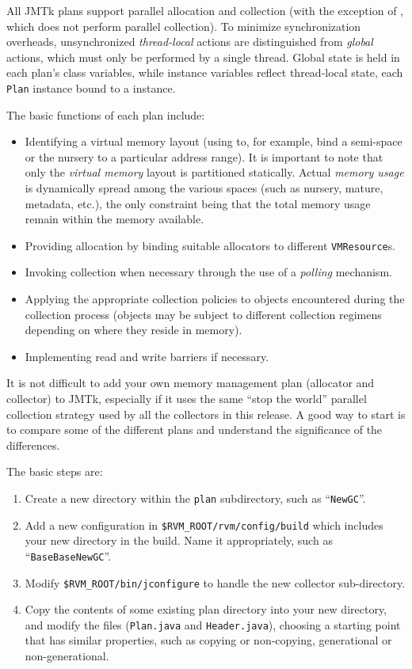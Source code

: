 All JMTk plans support parallel allocation and collection (with the
exception of , which does not perform parallel
collection).  To minimize synchronization overheads, unsynchronized
\emph{thread-local} actions are distinguished from \emph{global}
actions, which must only be performed by a single thread.  Global
state is held in each plan's class variables, while instance variables
reflect thread-local state, each \texttt{Plan} instance bound to a
 instance.

The basic functions of each plan include:
\begin{itemize}
\item Identifying a virtual memory layout (using
   to, for example, bind a
  semi-space or the nursery to a particular address range).  It is
  important to note that only the \emph{virtual memory} layout is
  partitioned statically.  Actual \emph{memory usage} is dynamically
  spread among the various spaces (such as nursery, mature, metadata,
  etc.), the only constraint being that the total memory usage remain
  within the memory available.
\item Providing allocation by binding suitable allocators to different
  \texttt{VMResource}s.
\item Invoking collection when necessary through the use of a
  \emph{polling} mechanism.
\item Applying the appropriate collection policies to objects
  encountered during the collection process (objects may be subject to
  different collection regimens depending on where they reside in
  memory).
\item Implementing read and write barriers if necessary.
\end{itemize}

It is not difficult to add your own memory management plan (allocator
and collector) to JMTk, especially if it uses the same ``stop the
world'' parallel collection strategy used by all the collectors in
this release.  A good way to start is to compare some of the different
plans and understand the significance of the differences.

The basic steps are:

%
%
\begin{enumerate}
\item Create a new directory within the \texttt{plan} subdirectory, such as
  ``\texttt{NewGC}''.
\item Add a new configuration in \texttt{\$RVM\_\-ROOT/rvm/config/build}
  which includes your new directory in the build.  Name it
  appropriately, such as ``\texttt{BaseBaseNewGC}''.
\item Modify \texttt{\$RVM\_\-ROOT/bin/jconfigure} to handle the new
  collector sub-directory.
\item Copy the contents of some existing plan directory into your new
  directory, and modify the files (\texttt{Plan.java} and
  \texttt{Header.java}), choosing a starting point that has similar
  properties, such as copying or non-copying, generational or
  non-generational.
\end{enumerate}

